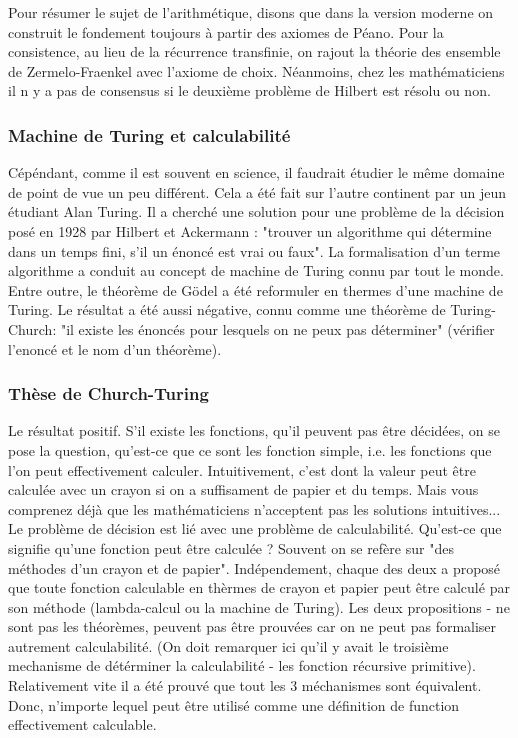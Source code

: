 \documentclass[12pt, a4paper]{article}
\begin{document}

Pour résumer le sujet de l'arithmétique, disons que dans la version moderne on construit le fondement toujours à partir des axiomes de Péano.
Pour la consistence, au lieu de la récurrence transfinie, on rajout la théorie des ensemble de Zermelo-Fraenkel avec l'axiome de choix.
Néanmoins, chez les mathématiciens il n y a pas de consensus si le deuxième problème de Hilbert est résolu ou non.

\subsubsection*{Machine de Turing et calculabilité}
Cépéndant, comme il est souvent en science, il faudrait étudier le même domaine de point de vue un peu différent. Cela a été fait sur l'autre continent par un jeun étudiant Alan Turing. Il a cherché une solution pour une problème de la décision posé en 1928 par Hilbert et Ackermann : "trouver un algorithme qui détermine dans un temps fini, s'il un énoncé est vrai ou faux". La formalisation d'un terme algorithme a conduit au concept de machine de Turing connu par tout le monde. Entre outre, le théorème de Gödel a été reformuler en thermes d'une machine de Turing.
Le résultat a été aussi négative, connu comme une théorème de Turing-Church: "il existe les énoncés pour lesquels on ne peux pas déterminer" (vérifier l'enoncé et le nom d'un théorème).

\subsubsection*{Thèse de Church-Turing}
Le résultat positif.
S'il existe les fonctions, qu'il peuvent pas être décidées, on se pose la question, qu'est-ce que ce sont les fonction simple, i.e. les fonctions que l'on peut effectivement calculer.
Intuitivement, c'est dont la valeur peut être calculée avec un crayon si on a suffisament de papier et du temps.
Mais vous comprenez déjà que les mathématiciens n'acceptent pas les solutions intuitives...
Le problème de décision est lié avec une problème de calculabilité. Qu'est-ce que signifie qu'une fonction peut être calculée ? Souvent on se refère sur "des méthodes d'un crayon et de papier". Indépendement, chaque des deux a proposé que toute fonction calculable en thèrmes de crayon et papier peut être calculé par son méthode (lambda-calcul ou la machine de Turing). Les deux propositions - ne sont pas les théorèmes, peuvent pas être prouvées car on ne peut pas formaliser autrement calculabilité. (On doit remarquer ici qu'il y avait le troisième mechanisme de détérminer la calculabilité - les fonction récursive primitive). Relativement vite il a été prouvé que tout les 3 méchanismes sont équivalent. Donc, n'importe lequel peut être utilisé comme une définition de function effectivement calculable.
\end{document}
